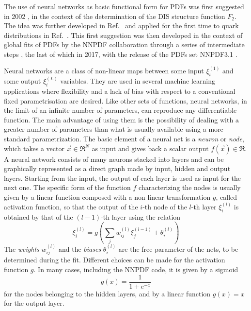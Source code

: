 %
The use of neural networks as basic functional form for PDFs was first suggested in 2002 \cite{Forte:2002fg},
in the context of the determination of the DIS structure function $F_2$. 
The idea was further developed in Ref.~\cite{DelDebbio:2004xtd} and applied for the first time to quark
distributions in Ref.~\cite{DelDebbio:2007ee}. This first suggestion was then developed in the context of 
global fits of PDFs by the NNPDF collaboration through a series of intermediate steps 
\cite{Ball:2008by, Ball:2010de, Ball:2012cx, Ball:2014uwa}, the last of which in 2017, with the
release of the PDFs set NNPDF3.1 \cite{Ball:2017nwa}.

%
Neural networks are a class of non-linear maps between some input $\xi_i^{(1)} $ 
and some output $\xi_i^{(L)} $ variables. They are used in several machine learning applications where flexibility
and a lack of bias with respect to a conventional fixed parametrisation  are  desired. 
Like other sets of functions, neural networks, in the limit of an infinite number of parameters, 
can reproduce any differentiable function. The main advantage of using them is the possibility of dealing 
with a greater number of parameters than what is usually available using a more standard parametrization.
The basic element of a neural net is a \textit{neuron} or \textit{node}, which takes a vector $\vec{x} \in \Re^N $ 
as input and gives back a scalar output $ f\left(\vec{x}\right) \in \Re$.
A neural network consists of many neurons stacked into layers and can be graphically represented as a direct graph made by input,
hidden and output layers.
Starting from the input, the output of each layer is used as input for the next one. 
The specific form of the function $f$ characterizing the nodes is usually given by a linear function 
composed with a non linear transformation $g$, called activation function, so that the output of the $i$-th node of 
the $l$-th layer $\xi_i^{(l)}$ is obtained by that of the $(l-1)$-th layer using the relation
\begin{equation}
\label{nodes}
\xi_i^{(l)}= g\left(\sum_jw_{ij}^{(l)}\xi_j^{(l-1)}+\theta_i^{(l)}\right)
\end{equation}
The \textit{weights} $w_{ij}^{(l)} $ and the \textit{biases} $\theta_i^{(l)} $ are the free parameter of the nets, 
to be determined during the fit.
Different choices can be made for the activation function $g$. 
In many cases, including the NNPDF code, it is given by a sigmoid
\begin{equation}
\label{sigmoid}
g\left(x\right)=\frac{1}{1+e^{-x}}
\end{equation}
for the nodes belonging to the hidden layers, and by a linear function $ g(x)=x $ for the output layer.
 
